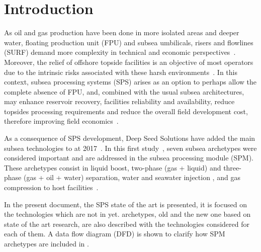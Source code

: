 \section{Introduction}
As oil and gas production have been done in more isolated areas and deeper water, floating production unit (FPU) and subsea umbilicals, risers and flowlines (SURF) demand more complexity in technical and economic perspectives~\citep{Basilio2018}. Moreover, the relief of offshore topside facilities is an objective of most operators due to the intrinsic risks associated with these harsh environments~\citep{Basilio2018}. In this context, subsea processing systems (SPS) arises as an option to perhaps allow the complete absence of FPU, and, combined with the usual subsea architectures, may enhance reservoir recovery, facilities reliability and availability, reduce topsides processing requirements and reduce the overall field development cost, therefore improving field economics~\citep{Basilio2018}.

As a consequence of SPS development, Deep Seed Solutions have added the main subsea technologies to \Floco at 2017~\citep{Oathkeeper2017}. In this first study~\citep{Oathkeeper2017}, seven subsea archetypes were considered important and are addressed in the subsea processing module (SPM). These archetypes consist in liquid boost, two-phase (gas + liquid) and three-phase (gas + oil + water) separation,  water and seawater injection , and gas compression to host facilities~\citep{Oathkeeper2017}.

In the present document, the SPS state of the art is presented, it is focused on the technologies which are not in \Floco yet. \Floco archetypes, old and the new one based on state of the art research, are also described with the technologies considered for each of them. A data flow diagram (DFD) is shown to clarify how SPM archetypes are included in \Floco.

\newpage
